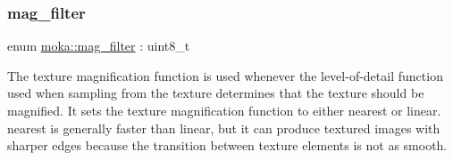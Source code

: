 \subsubsection{\texorpdfstring{mag\_filter}{mag\_filter}\hspace{0.1cm}{\footnotesize\ttfamily [1/2]}}
{\footnotesize\ttfamily enum \mbox{\hyperlink{namespacemoka_a2391e4ae99494b70d0226ee0e586f33c}{moka\+::mag\+\_\+filter}} \+: uint8\+\_\+t\hspace{0.3cm}{\ttfamily [strong]}}



The texture magnification function is used whenever the level-\/of-\/detail function used when sampling from the texture determines that the texture should be magnified. It sets the texture magnification function to either nearest or linear. nearest is generally faster than linear, but it can produce textured images with sharper edges because the transition between texture elements is not as smooth. 

